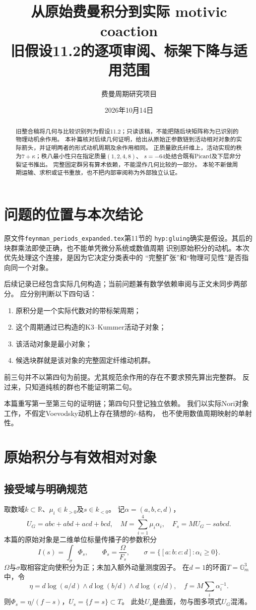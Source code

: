 \documentclass[11pt,a4paper]{ctexart}
\title{从原始费曼积分到实际 motivic coaction\\[5pt]
\large 旧假设11.2的逐项审阅、标架下降与适用范围}
\author{费曼周期研究项目}
\date{2026年10月14日}
\theoremstyle{cnplain}\newtheorem{theorem}{定理}[section]
\theoremstyle{remark}\newtheorem{remark}[theorem]{注}
\newcommand{\Gm}{\mathbb G_m}\newcommand{\PP}{\mathbb P}
\begin{document}
\maketitle
\begin{abstract}
旧整合稿将几何与比较识别列为假设11.2；只读该稿，不能把随后块矩阵称为已识别的物理动机余作用。
本补篇核对后续几何证明，给出从原始正参数链到活动相对对象的实际箭头，并证明两者的形式动机周期及余作用相同。
正质量欧氏纤维上，活动实现的秩为$7+\kappa$；秩八最小性只在指定质量$(1,2,4,8)$、
$s=-64$处结合既有Picard及下层非分裂证书推出。
完整固定群另有算术依赖，不能混作几何比较的一部分。
本轮不新做周期运输、求积或证书重放，也不把内部审阅称为外部独立认证。
\end{abstract}
\tableofcontents

\section{问题的位置与本次结论}
原文件\texttt{feynman\_periods\_expanded.tex}第11节的
\texttt{hyp:gluing}确实是假设。其后的块群乘法即使正确，也不能单凭微分系统或数值周期
识别原始积分的动机。本次优先处理这个连接，是因为它决定分类表中的
“完整扩张”和“物理可见性”是否指向同一个对象。

后续记录已经包含实际几何构造；当前问题兼有数学依赖审阅与正文未同步两部分。
应分别判断以下四句话：
\begin{enumerate}
\item 原积分是一个实际代数对的带标架周期；
\item 这个周期通过已构造的K3--Kummer活动子对象；
\item 该活动对象是最小对象；
\item 候选块群就是该对象的完整固定纤维动机群。
\end{enumerate}
前三句并不以第四句为前提。尤其规范余作用的存在不要求预先算出完整群。
反过来，只知道纯核的群也不能证明第二句。

本篇重写第一至第三句的证明链；第四句只登记独立依赖。
我们以实际Nori对象工作，不假定Voevodsky动机上存在猜想的$t$-结构，
也不使用数值周期映射的单射性。

\section{原始积分与有效相对对象}
\subsection{接受域与明确规范}
取数域$k\subset\mathbb R$、$\mu_i\in k_{>0}$及$s\in k_{<0}$。
记$\alpha=(a,b,c,d)$，
\[
 U_G=abc+abd+acd+bcd,\quad M=\sum_{i=1}^4\mu_i\alpha_i,\quad
 F_s=MU_G-sabcd.
\]
本篇的原始对象是二维单位标量传播子的参数积分
\[
 I(s)=\int_\sigma\Phi_s,\qquad \Phi_s=\frac{\Omega}{F_s},
 \qquad \sigma=\{[a:b:c:d]:\alpha_i\geq0\}.
\]
$\Omega$与$\sigma$取相容定向使积分为正；未加入额外动量测度因子。
在$d=1$的环面$T=\Gm^3$中，令
\[
 \eta=d\log(a/d)\wedge d\log(b/d)\wedge d\log(c/d),\quad
 f=M\sum_i\alpha_i^{-1}.
\]
则$\Phi_s=\eta/(f-s)$，$U_s=\{f=s\}\subset T$。
此处$U_s$是曲面，勿与图多项式$U_G$混淆。
\end{document}

